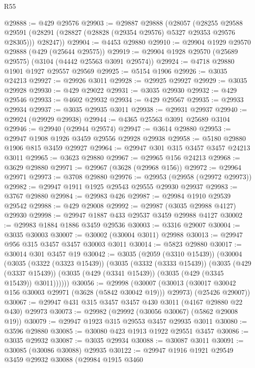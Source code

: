\begin{lexlean}{R55}
\begin{coremodule}
@29888 := @429 @29576
@29903 := @29887
    @29888
    (@28057
      (@28255
        @29588
        @29591
        (@28291 (@28827 (@28828 (@29354 @29576) @5327 @29353 @29576 @28305)))
        @28247))
@29904 := @4453 @29880
@29910 := @29904 @1929 @29570 @29888 (@429 (@25644 @29575))
@29919 := @29904 @1928 @29570 (@25689 @29575) (@3104 (@4442 @25563 @3091 @29574))
@29924 := @4718 @29880 @1901 @1927 @29557 @29569
@29925 := @5154 @1906
@29926 := @3035 @24213
@29927 := @29926 @3011
@29928 := @29925 @29927
@29929 := @3035 @29928
@29930 := @429 @29022
@29931 := @3035 @29930
@29932 := @429 @29546
@29933 := @4602 @29932
@29934 := @429 @29567
@29935 := @29933 @29934
@29937 := @3035 @29935 @3011
@29938 := @29931 @29937
@29940 := @29924 (@29929 @29938)
@29944 := @4365 @25563 @3091 @25689 @3104
@29946 := @29940 (@29944 @29574)
@29947 := @3614 @29880
@29953 := @29947 @1908 @1926 @3459 @29556 @29928 @29938
@29958 := @5180 @29880 @1906 @815 @3459 @29927
@29964 := @29947 @301 @315 @3457 @3457 @24213 @3011
@29965 := @3623 @29880
@29967 := @29965 @156 @24213
@29968 := @3629 @29880
@29971 := @29967 (@3628 (@29968 @156))
@29972 := @29964 @29971
@29973 := @3708 @29880
@29976 := @29953 (@29958 (@29972 @29973))
@29982 := @29947 @1911 @1925 @29543 @29555 @29930 @29937
@29983 := @3767 @29880
@29984 := @29983 @426
@29987 := @29984 @1910 @29539 @29542
@29988 := @429 @29008
@29992 := @29987 (@3035 @29988 @4127) @29930
@29998 := @29947 @1887 @433 @29537 @3459 @29988 @4127
@30002 := @29983 @1884 @1886 @3459 @29536
@30003 := @3316 @29007
@30004 := @3035 @30003
@30007 := @30002 (@30004 @3011) @29988
@30013 := @29947 @956 @315 @3457 @3457 @30003 @3011
@30014 := @5823 @29880
@30017 := @30014 @301 @3457 @19
@30042 := @3035
    (@2059 (@3310 @15439))
    (@30004
      (@3035
        (@3322 (@3323 @15439))
        (@3035
          (@3332 (@3333 @15439))
          (@3035
            (@429 (@3337 @15439))
            (@3035 (@429 (@3341 @15439)) (@3035 (@429 (@3345 @15439)) @3011))))))
@30056 := @29998
    (@30007
      (@30013 (@30017 @30042 @156 @30003 @29971 (@3628 (@5842 @30042 @19))) @29973)
      (@25426 @29007))
@30067 := @29947 @431 @315 @3457 @3457 @430 @3011 (@4167 @29880 @22 @430) @29973
@30073 := @29982 (@29992 (@30056 @30067) (@5862 @29008 @19))
@30079 := @29947 @1923 @315 @29553 @3457 @29935 @3011
@30080 := @3596 @29880
@30085 := @30080 @423 @1913 @1922 @29551 @3457
@30086 := @3035 @29932
@30087 := @3035 @29934
@30088 := @30087 @3011
@30091 := @30085 (@30086 @30088) @29935
@30122 := @29947
    @1916
    @1921
    @29549
    @3459
    @29932
    @30088
    (@29984
      @1915
      @3460

\end{coremodule}
\end{lexlean}
